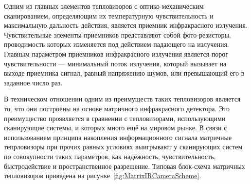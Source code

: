 \documentclass[14pt, a4paper]{extreport}
\begin{document}
	Одним из главных элементов тепловизоров с оптико-механическим сканированием, определяющим их температурную чувствительность и максимальную дальность действия, является приемник инфракрасного излучения. Чувствительные элементы приемников представляют собой фото-резисторы, проводимость которых изменяется под действием падающего на излучения. Главным параметром приемников инфракрасного излучения является порог чувствительности — минимальный поток излучения, который вызывает на выходе приемника сигнал, равный напряжению шумов, или превышающий его в заданное число раз.
	
	В техническом отношении одним из преимуществ таких тепловизоров является то, что они построены на основе матричного инфракрасного детектора. Это преимущество проявляется в сравнении с тепловизорами, использующими сканирующие системы, и которых много ещё на мировом рынке. В связи с использованием принципа накопления информационного сигнала матричные тепрловизоры при прочих равных условиях выигрывают у сканирующих систем по совокупности таких параметров, как надёжность, чувствительность, быстродействие и пространственное разрешение. Типовая блок-схема матричных тепловизоров приведена на рисунке~\ref{fig:MatrixIRCameraScheme}.
	
\end{document}
